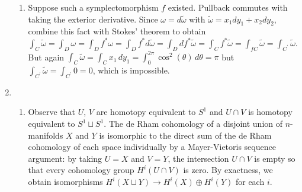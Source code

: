 \documentclass[11pt,leqno]{article}
\theoremstyle{plain}
\theoremstyle{definition}
\numberwithin{equation}{section}
\numberwithin{lem}{section}
\begin{document}
\begin{enumerate}
\begin{enumerate}
        \item Suppose such a symplectomorphism $f$ existed. Pullback commutes with taking the exterior derivative. Since $\omega = d\tilde\omega$ with $\tilde \omega = x_1dy_1 + x_2dy_2$, combine this fact with Stokes' theorem to obtain $\int_C\tilde\omega = \int_D \omega = \int_D f^\ast\omega = \int_D f^\ast d\tilde\omega = \int_D df^\ast\tilde\omega = \int_C f^\ast \tilde\omega = \int_{fC}\tilde\omega = \int_{C^\prime}\tilde \omega$. But again $\int_C\tilde\omega = \int_Cx_1\,dy_1 = \int_0^{2\pi}\cos^2(\theta)\,d\theta = \pi$ but $\int_{C^\prime}\tilde\omega = \int_{C^\prime} 0 = 0$, which is impossible.
    \end{enumerate}
    \item \begin{enumerate}
        \item Observe that $U$, $V$ are homotopy equivalent to $S^1$ and $U\cap V$ is homotopy equivalent to $S^1\sqcup S^1$. The de Rham cohomology of a disjoint union of $n$-manifolds $X$ and $Y$ is isomorphic to the direct sum of the de Rham cohomology of each space individually by a Mayer-Vietoris sequence argument: by taking $U = X$ and $V = Y$, the intersection $U\cap V$ is empty so that every cohomology group $H^i(U\cap V)$ is zero. By exactness, we obtain isomorphisms $H^i(X\sqcup Y)\to H^i(X)\oplus H^i(Y)$ for each $i$.
        

\end{enumerate}
\end{enumerate}
\end{document}
